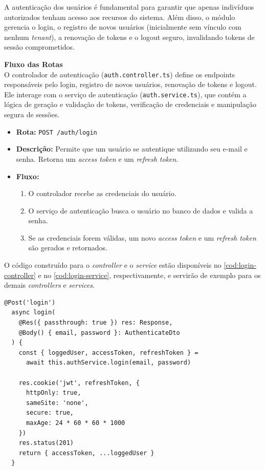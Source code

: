 A autenticação dos usuários é fundamental para garantir que apenas indivíduos autorizados tenham acesso aos recursos do sistema. Além disso, o módulo gerencia o login, o registro de novos usuários (inicialmente sem vínculo com nenhum \textit{tenant}), a renovação de tokens e o logout seguro, invalidando tokens de sessão comprometidos.

\noindent\textbf{Fluxo das Rotas}\\
O controlador de autenticação (\texttt{auth.controller.ts}) define os endpoints responsáveis pelo login, registro de novos usuários, renovação de tokens e logout. Ele interage com o serviço de autenticação (\texttt{auth.service.ts}), que contém a lógica de geração e validação de tokens, verificação de credenciais e manipulação segura de sessões.

\begin{itemize}
	\item \textbf{Rota:} \texttt{POST /auth/login}
	\item \textbf{Descrição:} Permite que um usuário se autentique utilizando seu e-mail e senha. Retorna um \textit{access token} e um \textit{refresh token}.
	\item \textbf{Fluxo:}
	\begin{enumerate}
		\item O controlador recebe as credenciais do usuário.
		\item O serviço de autenticação busca o usuário no banco de dados e valida a senha.
		\item Se as credenciais forem válidas, um novo \textit{access token} e um \textit{refresh token} são gerados e retornados.
	\end{enumerate}
\end{itemize}

O código construído para o \textit{controller} e  o \textit{service} estão disponíveis no \autoref{cod:login-controller} e  no \autoref{cod:login-service}, respectivamente, e servirão de exemplo para os demais \textit{controllers} e \textit{services}.

\begin{lstlisting}[caption={Exemplo de \textit{controller} para \textit{login}.},label={cod:login-controller}]
	@Post('login')
  async login(
    @Res({ passthrough: true }) res: Response,
    @Body() { email, password }: AuthenticateDto
  ) {
    const { loggedUser, accessToken, refreshToken } =
      await this.authService.login(email, password)

    res.cookie('jwt', refreshToken, {
      httpOnly: true,
      sameSite: 'none',
      secure: true,
      maxAge: 24 * 60 * 60 * 1000
    })
    res.status(201)
    return { accessToken, ...loggedUser }
  }
\end{lstlisting}

